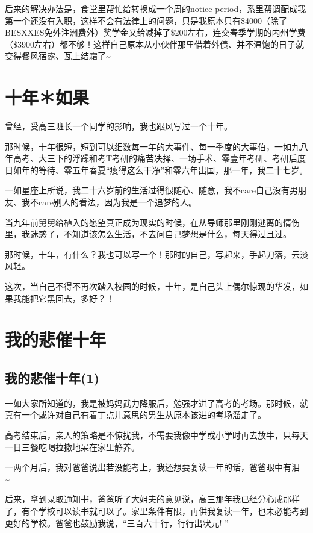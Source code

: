 \documentclass[12pt]{book}
\begin{document}
后来的解决办法是，食堂里帮忙给转换成一个周的notice period，系里帮调配成我第一个还没有入职，这样不会有法律上的问题，只是我原本只有\$4000（除了BESXXES免外注洲费外）奖学金又给减掉了\$200左右，连交春季学期的内州学费（\$3900左右）都不够！这样自己原本从小伙伴那里借着外债、并不温饱的日子就变得餐风宿露、瓦上结霜了\textasciitilde{}~
\chapter{十年＊如果}
\label{sec-21}

曾经，受高三班长一个同学的影响，我也跟风写过一个十年。

那时候，十年很短，短到可以细数每一年的大事件、每一季度的大事伯，一如九八年高考、大三下的浮躁和考T考研的痛苦决择、一场手术、零壹年考研、考研后度日如年的等待、零五年春夏“瘦得这么干净”和零六年出国，那一年，我二十七岁。

一如星座上所说，我二十六岁前的生活过得很随心、随意，我不care自己没有男朋友、我不care别人的看法，因为我是一个追梦的人。

当九年前舅舅给植入的愿望真正成为现实的时候，在从导师那里刚刚逃离的情伤里，我迷惑了，不知道该怎么生活，不去问自己梦想是什么，每天得过且过。

那时候，十年，有什么？我也可以写一个！那时的自己，写起来，手起刀落，云淡风轻。

这次，当自己不得不再次踏入校园的时候，十年，是自己头上偶尔惊现的华发，如果我能把它黑回去，多好？！

\chapter{我的悲催十年}
\label{sec-22}
\section{我的悲催十年(1)}
\label{sec-22-1}

一如大家所知道的，我是被妈妈武力降服后，勉强才进了高考的考场。那时候，就真有一个或许对自己有着丁点儿意思的男生从原本该进的考场溜走了。

高考结束后，亲人的策略是不惊扰我，不需要我像中学或小学时再去放牛，只每天一日三餐吃喝拉撒地呆在家里静养。

一两个月后，我对爸爸说出若没能考上，我还想要复读一年的话，爸爸眼中有泪\textasciitilde{}~

后来，拿到录取通知书，爸爸听了大姐夫的意见说，高三那年我已经分心成那样了，有个学校可以读书就可以了。家里条件有限，再供我复读一年，也未必能考到更好的学校。爸爸也鼓励我说，“三百六十行，行行出状元! ”
\end{document}
